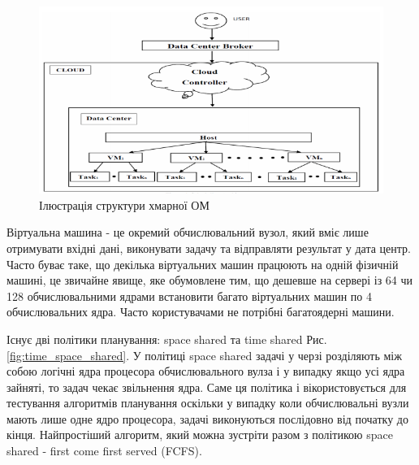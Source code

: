 \begin{figure}[H]
	\centering
	\includegraphics[width=\textwidth]{task_analysis/img/cloud_representation}
	\caption{Ілюстрація структури хмарної ОМ}
	\label{fig:cloud_representation}
\end{figure}

Віртуальна машина - це окремий обчислювальний вузол, який вміє лише отримувати вхідні дані, виконувати задачу та відправляти результат у дата центр. Часто буває таке, що декілька віртуальних машин працюють на одній фізичній машині, це звичайне явище, яке обумовлене тим, що дешевше на сервері із 64 чи 128 обчислювальними ядрами встановити багато віртуальних машин по 4 обчислювальних ядра. Часто користувачами не потрібні багатоядерні машини.

Існує дві політики планування: space shared та time shared Рис. \ref{fig:time_space_shared}. У політиці space shared задачі у черзі розділяють між собою логічні ядра процесора обчислювального вулза і у випадку якщо усі ядра зайняті, то задач чекає звільнення ядра. Саме ця політика і вікористовується для тестування алгоритмів планування оскільки у випадку коли обчислювальні вузли мають лише одне ядро процесора, задачі виконуються послідовно від початку до кінця. Найпростіший алгоритм, який можна зустріти разом з політикою space shared - first come first served (FCFS).

